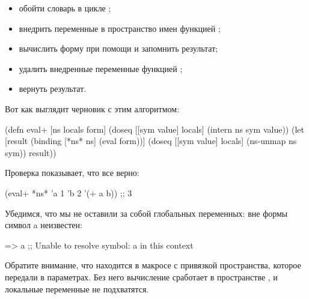 \begin{itemize}

\item
  обойти словарь  в цикле ;

\item
  внедрить переменные в пространство имен функцией ;

\item
  вычислить форму при помощи  и запомнить результат;

\item
  удалить внедренные переменные функцией ;

\item
  вернуть результат.

\end{itemize}

\pagebreaklarge

Вот как выглядит черновик  с этим алгоритмом:

\begin{english}
  \begin{clojure/lines}
(defn eval+ [ns locals form]
  (doseq [[sym value] locals]
    (intern ns sym value))
  (let [result
        (binding [*ns* ns]
          (eval form))]
    (doseq [[sym value] locals]
      (ns-unmap ns sym))
    result))
  \end{clojure/lines}
\end{english}

Проверка показывает, что все верно:

\begin{english}
  \begin{clojure}
(eval+ *ns* {'a 1 'b 2} '(+ a b))
;; 3
  \end{clojure}
\end{english}

Убедимся, что мы не оставили за собой глобальных переменных: вне формы  символ a неизвестен:

\begin{english}
  \begin{text}
=> a
;; Unable to resolve symbol: a in this context
  \end{text}
\end{english}

Обратите внимание, что   находится в макросе  с привязкой пространства, которое передали в параметрах. Без него вычисление сработает в пространстве , и локальные переменные не подхватятся.

